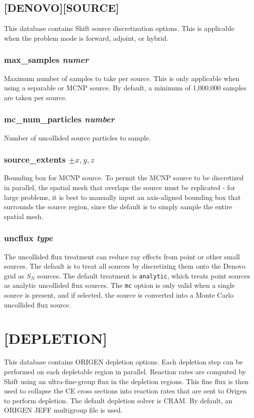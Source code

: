 \documentclass[10pt]{article}
\begin{document}
\subsection{[DENOVO][SOURCE]}
This database contains Shift source discretization options. This is applicable when the problem mode is forward, adjoint, or hybrid. 

\subsubsection{max\_samples \textit{numer}}
Maximum number of samples to take per source. This is only applicable when using a separable or MCNP source. By default, a minimum of 1,000,000 samples are taken per source.

\subsubsection{mc\_num\_particles \textit{number}}
Number of uncollided source particles to sample.

\subsubsection{source\_extents \textit{\(\pm x,y,z\)}}
Bounding box for MCNP source. To permit the MCNP source to be discretized in parallel, the spatial mesh that overlaps the source must be replicated - for large problems, it is best to manually input an axis-aligned bounding box that surrounds the source region, since the default is to simply sample the entire spatial mesh. 

\subsubsection{uncflux \textit{type}}
The uncollided flux treatment can reduce ray effects from point or other small sources. The default is to treat all sources by discretizing them onto the Denovo grid as \(S_N\) sources. The default treatment is \texttt{analytic}, which treats point sources as analytic uncollided flux sources. The \texttt{mc} option is only valid when a single source is present, and if selected, the source is converted into a Monte Carlo uncollided flux source.



\section{[DEPLETION]}
This database contains ORIGEN depletion options. Each depletion step can be performed on each depletable region in parallel. Reaction rates are computed by Shift using an ultra-fine-group flux in the depletion regions. This fine flux is then used to collapse the CE cross sections into reaction rates that are sent to Origen to perform depletion. The default depletion solver is CRAM. By default, an ORIGEN JEFF multigroup file is used. 
\end{document}
